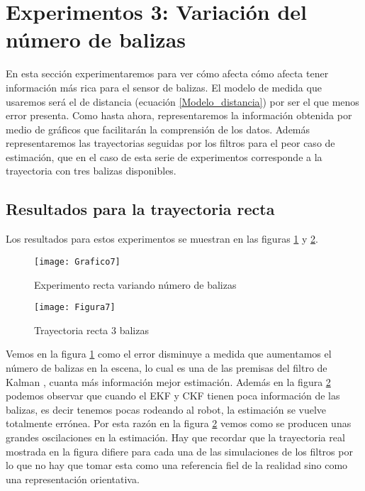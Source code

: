 \section{Experimentos 3: Variación del número de balizas}
En esta sección experimentaremos para ver cómo afecta cómo afecta tener información más rica para el sensor de balizas.
%
%
%
El modelo de medida que usaremos será el de distancia (ecuación \ref{Modelo_distancia}) por ser el que menos error presenta.
%
%
%
Como hasta ahora, representaremos la información obtenida por medio de gráficos que facilitarán la comprensión de los datos.
Además representaremos las trayectorias seguidas por los filtros para el peor caso de estimación, que en el caso de esta serie de experimentos corresponde a la trayectoria con tres balizas disponibles.
\subsection{Resultados para la trayectoria recta}
Los resultados para estos experimentos se muestran en las figuras \ref{Grafico7} y \ref{Figura7}.
\begin{figure}[ht!]
\centering
\texttt{[image: Grafico7]}
\caption{Experimento recta variando número de balizas} \label{Grafico7}
\end{figure}
\begin{figure}[ht!]
\centering
\texttt{[image: Figura7]}
\caption{Trayectoria recta 3 balizas} \label{Figura7}
\end{figure}
Vemos en la figura \ref{Grafico7} como el error disminuye a medida que aumentamos el número de balizas en la escena, lo cual es una de las premisas del filtro de Kalman , cuanta más información mejor estimación.
Además en la figura \ref{Figura7} podemos observar que cuando el \ac{EKF} y \ac{CKF} tienen poca información de las balizas, es decir tenemos pocas rodeando al robot, la estimación se vuelve totalmente errónea.
Por esta razón en la figura \ref{Figura7} vemos como se producen unas grandes oscilaciones en la estimación.
Hay que recordar que la trayectoria real mostrada en la figura difiere para cada una de las simulaciones de los filtros por lo que no hay que tomar esta como una referencia fiel de la realidad sino como una representación orientativa.

